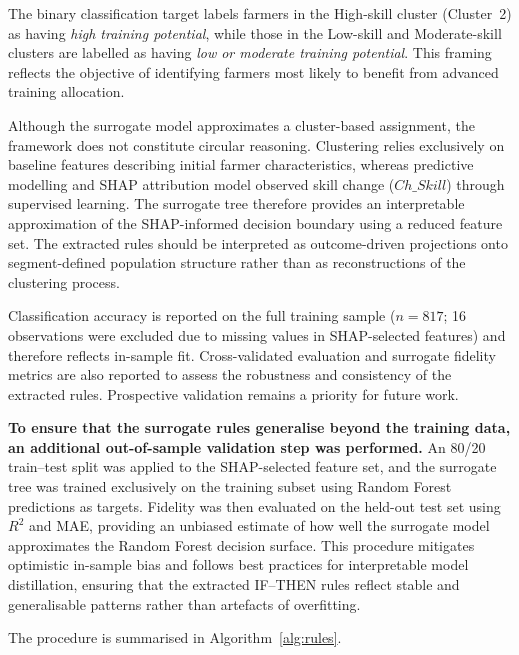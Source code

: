 \documentclass[3p,twocolumn,authoryear]{elsarticle}
\begin{document}
The binary classification target labels farmers in the High-skill cluster
(Cluster~2) as having \textit{high training potential}, while those in the
Low-skill and Moderate-skill clusters are labelled as having
\textit{low or moderate training potential}.
This framing reflects the objective of identifying farmers most likely to
benefit from advanced training allocation.

Although the surrogate model approximates a cluster-based assignment,
the framework does not constitute circular reasoning.
Clustering relies exclusively on baseline features describing initial
farmer characteristics, whereas predictive modelling and SHAP
attribution model observed skill change ($Ch\_Skill$) through supervised
learning.
The surrogate tree therefore provides an interpretable approximation of
the SHAP-informed decision boundary using a reduced feature set.
The extracted rules should be interpreted as outcome-driven projections
onto segment-defined population structure rather than as reconstructions
of the clustering process.

Classification accuracy is reported on the full training sample
($n = 817$; 16 observations were excluded due to missing values in
SHAP-selected features) and therefore reflects in-sample fit.
Cross-validated evaluation and surrogate fidelity metrics are also
reported to assess the robustness and consistency of the extracted rules.
Prospective validation remains a priority for future work.

\textbf{To ensure that the surrogate rules generalise beyond the training data, an additional out-of-sample validation step was performed.}
An 80/20 train--test split was applied to the SHAP-selected feature set, and the surrogate tree was trained exclusively on the training subset using Random Forest predictions as targets.
Fidelity was then evaluated on the held-out test set using $R^{2}$ and MAE, providing an unbiased estimate of how well the surrogate model approximates the Random Forest decision surface.
This procedure mitigates optimistic in-sample bias and follows best practices for interpretable model distillation, ensuring that the extracted IF--THEN rules reflect stable and generalisable patterns rather than artefacts of overfitting.

The procedure is summarised in Algorithm~\ref{alg:rules}.
\end{document}
